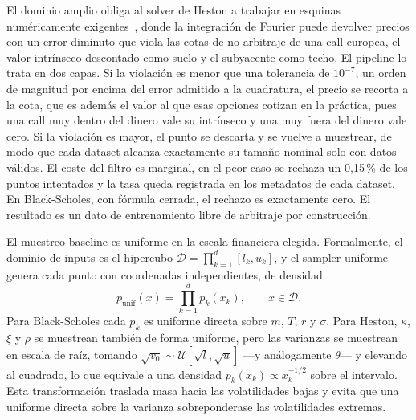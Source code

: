 \documentclass[11pt,a4paper]{article}
\begin{document}
 
El dominio amplio obliga al solver de Heston a trabajar en esquinas numéricamente exigentes~\cite{lordkahl2007}, donde la integración de Fourier puede devolver precios con un error diminuto que viola las cotas de no arbitraje de una call europea, el valor intrínseco descontado como suelo y el subyacente como techo. El pipeline lo trata en dos capas. Si la violación es menor que una tolerancia de $10^{-7}$, un orden de magnitud por encima del error admitido a la cuadratura, el precio se recorta a la cota, que es además el valor al que esas opciones cotizan en la práctica, pues una call muy dentro del dinero vale su intrínseco y una muy fuera del dinero vale cero. Si la violación es mayor, el punto se descarta y se vuelve a muestrear, de modo que cada dataset alcanza exactamente su tamaño nominal solo con datos válidos. El coste del filtro es marginal, en el peor caso se rechaza un 0,15\,\% de los puntos intentados y la tasa queda registrada en los metadatos de cada dataset. En Black-Scholes, con fórmula cerrada, el rechazo es exactamente cero. El resultado es un dato de entrenamiento libre de arbitraje por construcción.

El muestreo baseline es uniforme en la escala financiera elegida. Formalmente, el dominio de inputs es el hipercubo $\mathcal{D} = \prod_{k=1}^{d} [l_k, u_k]$, y el sampler uniforme genera cada punto con coordenadas independientes, de densidad
\begin{equation}
p_{\text{unif}}(x) = \prod_{k=1}^{d} p_k(x_k), \qquad x \in \mathcal{D}.
\label{eq:p-unif}
\end{equation}
Para Black-Scholes cada $p_k$ es uniforme directa sobre $m$, $T$, $r$ y $\sigma$. Para Heston, $\kappa$, $\xi$ y $\rho$ se muestrean también de forma uniforme, pero las varianzas se muestrean en escala de raíz, tomando $\sqrt{v_0} \sim \mathcal{U}[\sqrt{l},\sqrt{u}]$ —y análogamente $\theta$— y elevando al cuadrado, lo que equivale a una densidad $p_k(x_k) \propto x_k^{-1/2}$ sobre el intervalo. Esta transformación traslada masa hacia las volatilidades bajas y evita que una uniforme directa sobre la varianza sobreponderase las volatilidades extremas.
\end{document}

